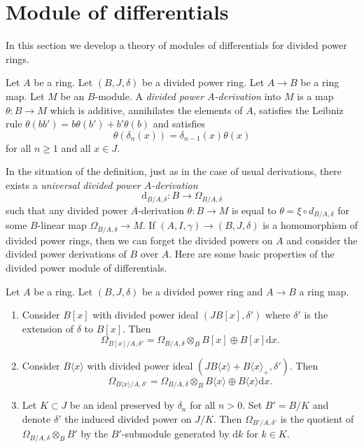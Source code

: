 \section{Module of differentials}
\label{section-differentials}

\noindent
In this section we develop a theory of modules of differentials
for divided power rings.

\begin{definition}
\label{definition-derivation}
Let $A$ be a ring. Let $(B, J, \delta)$ be a divided power ring.
Let $A \to B$ be a ring map. Let $M$ be an $B$-module.
A {\it divided power $A$-derivation} into $M$ is a map
$\theta : B \to M$ which is additive, annihilates the elements
of $A$, satisfies the Leibniz rule
$\theta(bb') = b\theta(b') + b'\theta(b)$ and satisfies
$$
\theta(\delta_n(x)) = \delta_{n - 1}(x)\theta(x)
$$
for all $n \geq 1$ and all $x \in J$.
\end{definition}

\noindent
In the situation of the definition, just as in the case of usual
derivations, there exists a {\it universal divided power $A$-derivation}
$$
\text{d}_{B/A, \delta} : B \to \Omega_{B/A, \delta}
$$
such that any divided power $A$-derivation $\theta : B \to M$ is equal to
$\theta = \xi \circ d_{B/A, \delta}$ for some $B$-linear map
$\Omega_{B/A, \delta} \to M$. If $(A, I, \gamma) \to (B, J, \delta)$
is a homomorphism of divided power rings, then we can forget the
divided powers on $A$ and consider the divided power derivations of
$B$ over $A$. Here are some basic properties of the divided power
module of differentials.

\begin{lemma}
\label{lemma-omega}
Let $A$ be a ring. Let $(B, J, \delta)$ be a divided power ring and
$A \to B$ a ring map. 
\begin{enumerate}
\item Consider $B[x]$ with divided power ideal $(JB[x], \delta')$
where $\delta'$ is the extension of $\delta$ to $B[x]$. Then
$$
\Omega_{B[x]/A, \delta'} =
\Omega_{B/A, \delta} \otimes_B B[x] \oplus B[x]\text{d}x.
$$
\item Consider $B\langle x \rangle$ with divided power ideal
$(JB\langle x \rangle + B\langle x \rangle_{+}, \delta')$. Then
$$
\Omega_{B\langle x\rangle/A, \delta'} =
\Omega_{B/A, \delta} \otimes_B B\langle x \rangle \oplus
B\langle x\rangle \text{d}x.
$$
\item Let $K \subset J$ be an ideal preserved by $\delta_n$ for
all $n > 0$. Set $B' = B/K$ and denote $\delta'$ the induced
divided power on $J/K$. Then $\Omega_{B'/A, \delta'}$ is the quotient
of $\Omega_{B/A, \delta} \otimes_B B'$ by the $B'$-submodule generated
by $\text{d}k$ for $k \in K$.
\end{enumerate}
\end{lemma}

